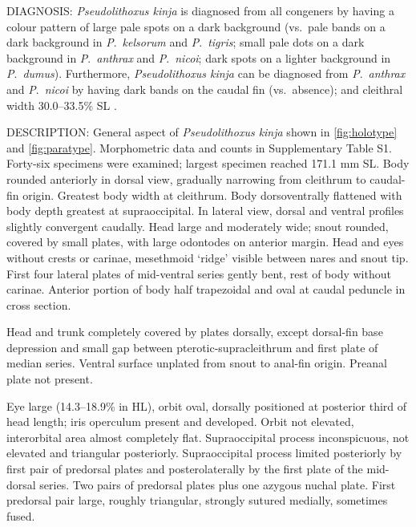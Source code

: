 \documentclass[12pt]{article}
\begin{document}
\noindent DIAGNOSIS: \emph{Pseudolithoxus kinja} is diagnosed from all congeners by having a colour pattern of large pale spots on a dark background (vs.\ pale bands on a dark background in \emph{P}.\ \emph{kelsorum} and \emph{P}.\ \emph{tigris}; small pale dots on a dark background in \emph{P}.\ \emph{anthrax} and \emph{P}.\ \emph{nicoi}; dark spots on a lighter background in \emph{P}.\ \emph{dumus}). %
Furthermore, \emph{Pseudolithoxus kinja} can be diagnosed from \emph{P}.\ \emph{anthrax} and \emph{P}.\ \emph{nicoi} by having dark bands on the caudal fin (vs.\ absence); and cleithral width 30.0--33.5\% SL \citep[vs.\ 27.2--30.5\% in \emph{P}.\ \emph{anthrax} and 27.0--28.6\% in \emph{P}.\ \emph{nicoi}; data from ][]{Armbruster2000}.\\%
\bigskip

\noindent DESCRIPTION: General aspect of \emph{Pseudolithoxus kinja} shown in \autoref{fig:holotype} and \autoref{fig:paratype}. %
Morphometric data and counts in Supplementary Table S1. %
Forty-six specimens were examined; largest specimen reached 171.1 mm SL. %
Body rounded anteriorly in dorsal view, gradually narrowing from cleithrum to caudal-fin origin. %
Greatest body width at cleithrum. %
Body dorsoventrally flattened with body depth greatest at supraoccipital. %
In lateral view, dorsal and ventral profiles slightly convergent caudally. %
Head large and moderately wide; snout rounded, covered by small plates, with large odontodes on anterior margin. %
Head and eyes without crests or carinae, mesethmoid `ridge' visible between nares and snout tip. %
First four lateral plates of mid-ventral series gently bent, rest of body without carinae. %
Anterior portion of body half trapezoidal and oval at caudal peduncle in cross section.%

Head and trunk completely covered by plates dorsally, except dorsal-fin base depression and small gap between pterotic-supracleithrum and first plate of median series. %
Ventral surface unplated from snout to anal-fin origin. %
Preanal plate not present.%

Eye large (14.3--18.9\% in HL), orbit oval, dorsally positioned at posterior third of head length; iris operculum present and developed. %
Orbit not elevated, interorbital area almost completely flat. %
Supraoccipital process inconspicuous, not elevated and triangular posteriorly. %
Supraoccipital process limited posteriorly by first pair of predorsal plates and posterolaterally by the first plate of the mid-dorsal series. %
Two pairs of predorsal plates plus one azygous nuchal plate. First predorsal pair large, roughly triangular, strongly sutured medially, sometimes fused.%
\end{document}
